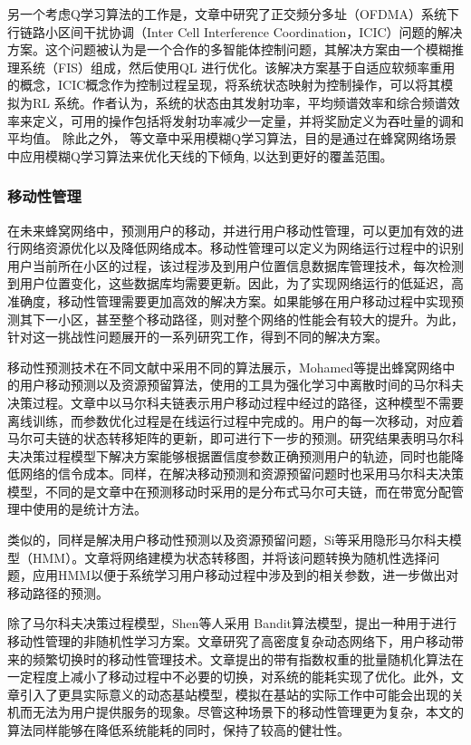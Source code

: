 ﻿\documentclass[11pt,draftclsnofoot,onecolumn,journal,letterpaper]{IEEEtran}
\begin{document}
另一个考虑Q学习算法的工作是\cite{Dirani2010}，文章中研究了正交频分多址（OFDMA）系统下行链路小区间干扰协调（Inter Cell Interference Coordination，ICIC）问题的解决方案。这个问题被认为是一个合作的多智能体控制问题，其解决方案由一个模糊推理系统（FIS）组成，然后使用QL 进行优化。该解决方案基于自适应软频率重用的概念，ICIC概念作为控制过程呈现，将系统状态映射为控制操作，可以将其模拟为RL 系统。作者认为，系统的状态由其发射功率，平均频谱效率和综合频谱效率来定义，可用的操作包括将发射功率减少一定量，并将奖励定义为吞吐量的调和平均值。
除此之外，\cite{Razavi2010}\cite{Razavi2010a}\cite{Islam2012} 等文章中采用模糊Q学习算法，目的是通过在蜂窝网络场景中应用模糊Q学习算法来优化天线的下倾角, 以达到更好的覆盖范围。

\subsubsection{移动性管理}
在未来蜂窝网络中，预测用户的移动，并进行用户移动性管理，可以更加有效的进行网络资源优化以及降低网络成本。移动性管理可以定义为网络运行过程中的识别用户当前所在小区的过程，该过程涉及到用户位置信息数据库管理技术，每次检测到用户位置变化，这些数据库均需要更新。因此，为了实现网络运行的低延迟，高准确度，移动性管理需要更加高效的解决方案。如果能够在用户移动过程中实现预测其下一小区，甚至整个移动路径，则对整个网络的性能会有较大的提升。为此，针对这一挑战性问题展开的一系列研究工作，得到不同的解决方案。

移动性预测技术在不同文献中采用不同的算法展示，Mohamed等\cite{Mohamed2015}提出蜂窝网络中的用户移动预测以及资源预留算法，使用的工具为强化学习中离散时间的马尔科夫决策过程。文章中以马尔科夫链表示用户移动过程中经过的路径，这种模型不需要离线训练，而参数优化过程是在线运行过程中完成的。用户的每一次移动，对应着马尔可夫链的状态转移矩阵的更新，即可进行下一步的预测。研究结果表明马尔科夫决策过程模型下解决方案能够根据置信度参数正确预测用户的轨迹，同时也能降低网络的信令成本。同样，\cite{Fazio2013}在解决移动预测和资源预留问题时也采用马尔科夫决策模型，不同的是文章中在预测移动时采用的是分布式马尔可夫链，而在带宽分配管理中使用的是统计方法。

类似的，同样是解决用户移动性预测以及资源预留问题，Si等\cite{Si2010}采用隐形马尔科夫模型（HMM）。文章将网络建模为状态转移图，并将该问题转换为随机性选择问题，应用HMM以便于系统学习用户移动过程中涉及到的相关参数，进一步做出对移动路径的预测。

除了马尔科夫决策过程模型，Shen等人采用 Bandit算法模型\cite{Shen2016}，提出一种用于进行移动性管理的非随机性学习方案。文章研究了高密度复杂动态网络下，用户移动带来的频繁切换时的移动性管理技术。文章提出的带有指数权重的批量随机化算法在一定程度上减小了移动过程中不必要的切换，对系统的能耗实现了优化。此外，文章引入了更具实际意义的动态基站模型，模拟在基站的实际工作中可能会出现的关机而无法为用户提供服务的现象。尽管这种场景下的移动性管理更为复杂，本文的算法同样能够在降低系统能耗的同时，保持了较高的健壮性。
\end{document}
